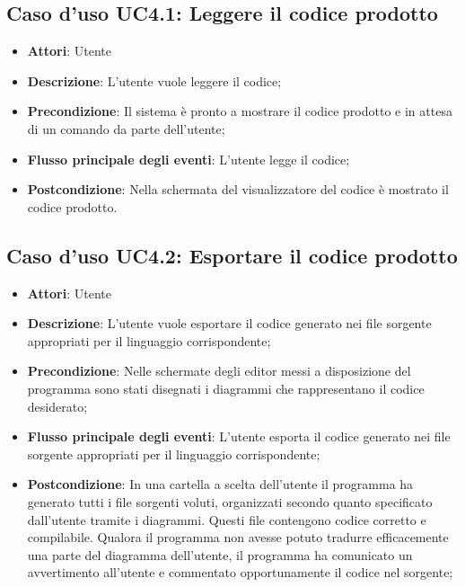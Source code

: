 \documentclass[../AnalisiDeiRequisiti.tex]{subfiles}
\begin{document}
					\subsection{Caso d'uso UC4.1: Leggere il codice prodotto}
					\begin{itemize}
						\item \textbf{Attori}: Utente
						\item \textbf{Descrizione}: L'utente vuole leggere il codice;
						\item \textbf{Precondizione}: Il sistema è pronto a mostrare il codice prodotto e in attesa di un comando da parte dell'utente;
						\item \textbf{Flusso principale degli eventi}: L'utente legge il codice;
						\item \textbf{Postcondizione}: Nella schermata del visualizzatore del codice è mostrato il codice prodotto.
					\end{itemize}
					\subsection{Caso d'uso UC4.2: Esportare il codice prodotto}
					\begin{itemize}
						\item \textbf{Attori}: Utente
						\item \textbf{Descrizione}: L'utente vuole esportare il codice generato nei file sorgente appropriati per il linguaggio corrispondente;
						\item \textbf{Precondizione}: Nelle schermate degli editor messi a disposizione del programma sono stati disegnati i diagrammi che rappresentano il codice desiderato;
						\item \textbf{Flusso principale degli eventi}: L'utente esporta il codice generato nei file sorgente appropriati per il linguaggio corrispondente;
						\item \textbf{Postcondizione}: In una cartella a scelta dell'utente il programma ha generato tutti i file sorgenti voluti, organizzati secondo quanto specificato dall'utente tramite i diagrammi. Questi file contengono codice corretto e compilabile. Qualora il programma non avesse potuto tradurre efficacemente una parte del diagramma dell'utente, il programma ha comunicato un avvertimento all'utente e commentato opportunamente il codice nel sorgente;
					\end{itemize}
\end{document}
